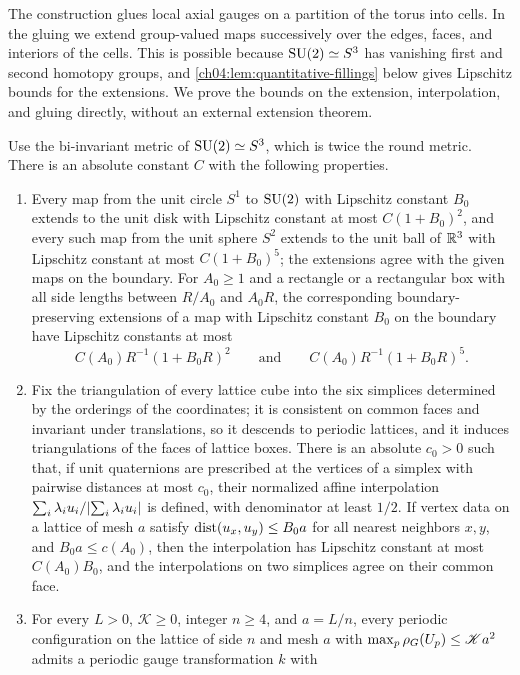 The construction glues local axial gauges on a partition of the torus into cells. In the gluing we extend group-valued maps successively over the edges, faces, and interiors of the cells. This is possible because $\mathrm{SU}(2)\simeq S^3$ has vanishing first and second homotopy groups, and \cref{ch04:lem:quantitative-fillings} below gives Lipschitz bounds for the extensions. We prove the bounds on the extension, interpolation, and gluing directly, without an external extension theorem.

\begin{lemma}\label{ch04:lem:quantitative-fillings}
Use the bi-invariant metric of $\mathrm{SU}(2)\simeq S^3$, which is twice the round metric. There is an absolute constant $C$ with the following properties.
\begin{enumerate}
\item Every map from the unit circle $S^1$ to $\mathrm{SU}(2)$ with Lipschitz constant $B_0$ extends to the unit disk with Lipschitz constant at most $C(1+B_0)^2$, and every such map from the unit sphere $S^2$ extends to the unit ball of $\mathbb R^3$ with Lipschitz constant at most $C(1+B_0)^5$; the extensions agree with the given maps on the boundary. For $A_0\ge1$ and a rectangle or a rectangular box with all side lengths between $R/A_0$ and $A_0R$, the corresponding boundary-preserving extensions of a map with Lipschitz constant $B_0$ on the boundary have Lipschitz constants at most
\[
 C(A_0)R^{-1}(1+B_0R)^2\qquad\text{and}\qquad C(A_0)R^{-1}(1+B_0R)^5.
\]
\item Fix the triangulation of every lattice cube into the six simplices determined by the orderings of the coordinates; it is consistent on common faces and invariant under translations, so it descends to periodic lattices, and it induces triangulations of the faces of lattice boxes. There is an absolute $c_0>0$ such that, if unit quaternions are prescribed at the vertices of a simplex with pairwise distances at most $c_0$, their normalized affine interpolation $\sum_i\lambda_iu_i/\lvert \sum_i\lambda_iu_i\rvert$ is defined, with denominator at least $1/2$. If vertex data on a lattice of mesh $a$ satisfy $\operatorname{dist}(u_x,u_y)\le B_0a$ for all nearest neighbors $x,y$, and $B_0a\le c(A_0)$, then the interpolation has Lipschitz constant at most $C(A_0)B_0$, and the interpolations on two simplices agree on their common face.
\item For every $L>0$, $\mathscr K\ge0$, integer $n\ge4$, and $a=L/n$, every periodic configuration on the lattice of side $n$ and mesh $a$ with $\max_p\rho_G(U_p)\le\mathscr Ka^2$ admits a periodic gauge transformation $k$ with

\end{enumerate}
\end{lemma}
